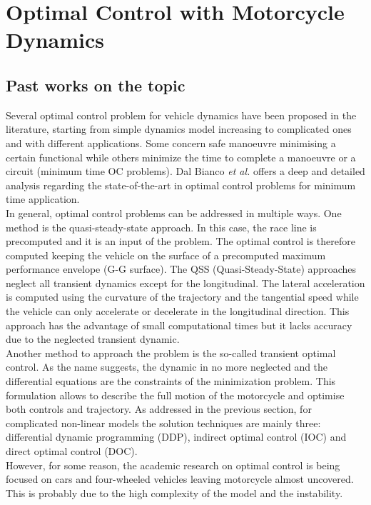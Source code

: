 \section{Optimal Control with Motorcycle Dynamics}
\label{chapter1_2}
%
\subsection{Past works on the topic}
%
Several optimal control problem for vehicle dynamics have been proposed in the literature, starting from simple dynamics model increasing to complicated ones and with different applications. Some concern safe manoeuvre minimising a certain functional while others minimize the time to complete a manoeuvre or a circuit (minimum time OC problems). Dal Bianco \textit{et al.}\cite{dal2019comparison} offers a deep and detailed analysis regarding the state-of-the-art in optimal control problems for minimum time application.\\
In general, optimal control problems can be addressed in multiple ways. One method is the quasi-steady-state approach. In this case, the race line is precomputed and it is an input of the problem. The optimal control is therefore computed keeping the vehicle on the surface of a precomputed maximum performance envelope (G-G surface). The QSS (Quasi-Steady-State) approaches neglect all transient dynamics except for the longitudinal. The lateral acceleration is computed using the curvature of the trajectory and the tangential speed while the vehicle can only accelerate or decelerate in the longitudinal direction. This approach has the advantage of small computational times but it lacks accuracy due to the neglected transient dynamic.\\
Another method to approach the problem is the so-called transient optimal control. As the name suggests, the dynamic in no more neglected and the differential equations are the constraints of the minimization problem. This formulation allows to describe the full motion of the motorcycle and optimise both controls and trajectory. As addressed in the previous section, for complicated non-linear models the solution techniques are mainly three: differential dynamic programming (DDP), indirect optimal control (IOC) and direct optimal control (DOC).\\
However, for some reason, the academic research on optimal control is being focused on cars and four-wheeled vehicles leaving motorcycle almost uncovered. This is probably due to the high complexity of the model and the instability.\\
